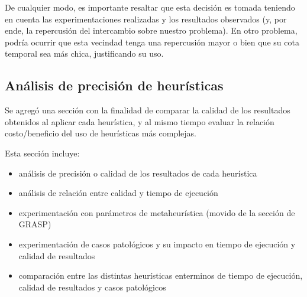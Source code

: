 		
		De cualquier modo, es importante resaltar que esta decisión es tomada teniendo en cuenta las experimentaciones realizadas y los resultados observados (y, por ende, la repercusión del intercambio sobre nuestro problema). En otro problema, podría ocurrir que esta vecindad tenga una repercusión mayor o bien que su cota temporal sea más chica, justificando su uso.
		
	\subsection*{Análisis de precisión de heurísticas}

		Se agregó una sección con la finalidad de comparar la calidad de los resultados obtenidos al aplicar cada heurística, y al mismo tiempo evaluar la relación costo/beneficio del uso de heurísticas más complejas.

		Esta sección incluye:

		\begin{itemize}
			\item análisis de precisión o calidad de los resultados de cada heurística

			\item análisis de relación entre calidad y tiempo de ejecución

			\item experimentación con parámetros de metaheurística (movido de la sección de GRASP)

			\item experimentación de casos patológicos y su impacto en tiempo de ejecución y calidad de resultados

			\item comparación entre las distintas heurísticas enterminos de tiempo de ejecución, calidad de resultados y casos patológicos
		\end{itemize}